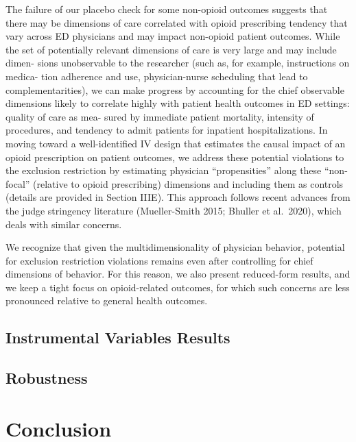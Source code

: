 \documentclass[,,nonblindrev]{informs}
\begin{document}
The failure of our placebo check for some non-opioid outcomes suggests
that there may be dimensions of care correlated with opioid prescribing
tendency that vary across ED physicians and may impact non-opioid
patient outcomes. While the set of potentially relevant dimensions of
care is very large and may include dimen- sions unobservable to the
researcher (such as, for example, instructions on medica- tion adherence
and use, physician-nurse scheduling that lead to complementarities), we
can make progress by accounting for the chief observable dimensions
likely to correlate highly with patient health outcomes in ED settings:
quality of care as mea- sured by immediate patient mortality, intensity
of procedures, and tendency to admit patients for inpatient
hospitalizations. In moving toward a well-identified IV design that
estimates the causal impact of an opioid prescription on patient
outcomes, we address these potential violations to the exclusion
restriction by estimating physician ``propensities'' along these
``non-focal'' (relative to opioid prescribing) dimensions and including
them as controls (details are provided in Section IIIE). This approach
follows recent advances from the judge stringency literature
(Mueller-Smith 2015; Bhuller et al.~2020), which deals with similar
concerns.

We recognize that given the multidimensionality of physician behavior,
potential for exclusion restriction violations remains even after
controlling for chief dimensions of behavior. For this reason, we also
present reduced-form results, and we keep a tight focus on
opioid-related outcomes, for which such concerns are less pronounced
relative to general health outcomes.

\hypertarget{instrumental-variables-results}{%
\subsection{Instrumental Variables
Results}\label{instrumental-variables-results}}

\hypertarget{robustness}{%
\subsection{Robustness}\label{robustness}}

\hypertarget{conclusion}{%
\section{Conclusion}\label{conclusion}}
\end{document}

